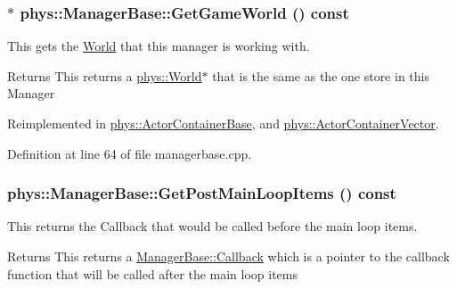 \hypertarget{classphys_1_1ManagerBase_addfd62fbc444ca4c2aba40768d1b284e}{
\subsubsection[{GetGameWorld}]{ $\ast$ phys::ManagerBase::GetGameWorld () const}}
\label{d2/de3/classphys_1_1ManagerBase_addfd62fbc444ca4c2aba40768d1b284e}


This gets the \hyperlink{classphys_1_1World}{World} that this manager is working with. 

\begin{DoxyReturn}{Returns}
This returns a \hyperlink{classphys_1_1World}{phys::World}$\ast$ that is the same as the one store in this Manager 
\end{DoxyReturn}


Reimplemented in \hyperlink{classphys_1_1ActorContainerBase_a479e6c7434f2611b0cfe6ca1fd4ebdd1}{phys::ActorContainerBase}, and \hyperlink{classphys_1_1ActorContainerVector_a5519eb0000073a2f397e158bfc368349}{phys::ActorContainerVector}.



Definition at line 64 of file managerbase.cpp.

\hypertarget{classphys_1_1ManagerBase_a1e541b261e5747ebcfcefdd3dcff78ce}{
\subsubsection[{GetPostMainLoopItems}]{ phys::ManagerBase::GetPostMainLoopItems () const}}
\label{d2/de3/classphys_1_1ManagerBase_a1e541b261e5747ebcfcefdd3dcff78ce}


This returns the Callback that would be called before the main loop items. 

\begin{DoxyReturn}{Returns}
This returns a \hyperlink{classphys_1_1ManagerBase_a753f5f0127131529767beab2502f480b}{ManagerBase::Callback} which is a pointer to the callback function that will be called after the main loop items 
\end{DoxyReturn}


